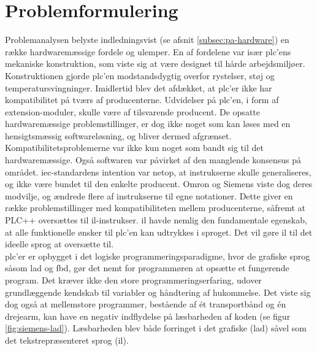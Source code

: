 \section{Problemformulering}
\label{sec:problemformulering}
Problemanalysen belyste indledningsvist (se afsnit \ref{subsec:pa-hardware}) en række hardwaremæssige fordele og ulemper. En af fordelene var især \gls{plc}'ens mekaniske konstruktion, som viste sig at være designet til hårde arbejdsmiljøer. Konstruktionen gjorde \gls{plc}’en modstandsdygtig overfor rystelser, støj og temperatursvingninger. Imidlertid blev det afdækket, at \gls{plc}’er ikke har kompatibilitet på tværs af producenterne. Udvidelser på \gls{plc}’en, i form af extension-moduler, skulle være af tilsvarende producent. De opsatte hardwaremæssige problemstillinger, er dog ikke noget som kan løses med en hensigtsmæssig softwareløsning, og bliver dermed afgrænset. \\ 

\noindent Kompatibilitetsproblemerne var ikke kun noget som bandt sig til det hardwaremæssige. Også softwaren var påvirket af den manglende konsensus på området. \gls{iec}-standardens intention var netop, at instrukserne skulle generaliseres, og ikke være bundet til den enkelte producent. Omron og Siemens viste dog deres modvilje, og ændrede flere af instrukserne til egne notationer. Dette giver en række problemstillinger med kompatibiliteten mellem producenterne, såfremt at PLC++ oversættes til \gls{il}-instrukser. \gls{il} havde nemlig den fundamentale egenskab, at alle funktionelle ønsker til \gls{plc}’en kan udtrykkes i sproget. Det vil gøre \gls{il} til det ideelle sprog at oversætte til. \\

\noindent \gls{plc}'er er opbygget i det logiske programmeringsparadigme, hvor de grafiske sprog såsom \gls{lad} og \gls{fbd}, gør det nemt for programmøren at opsætte et fungerende program. Det kræver ikke den store programmeringserfaring, udover grundlæggende kendskab til variabler og håndtering af hukommelse. Det viste sig dog også at mellemstore programmer, bestående af ét transportbånd og én drejearm, kan have en negativ indflydelse på læsbarheden af koden (se figur \ref{fig:siemens-lad}). Læsbarheden blev både forringet i det grafiske (\gls{lad}) såvel som det tekstrepræsenteret sprog (\gls{il}). \\

